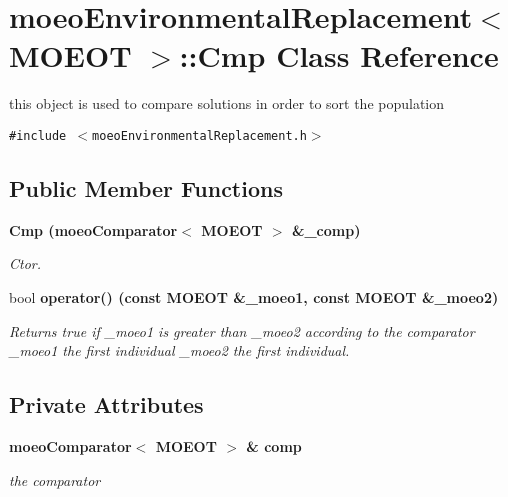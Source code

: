 \section{moeo\-Environmental\-Replacement$<$ MOEOT $>$::Cmp Class Reference}
\label{classmoeoEnvironmentalReplacement_1_1Cmp}
this object is used to compare solutions in order to sort the population  


{\tt \#include $<$moeo\-Environmental\-Replacement.h$>$}

\subsection*{Public Member Functions}
\begin{CompactItemize}
\item 
\bf{Cmp} (\bf{moeo\-Comparator}$<$ MOEOT $>$ \&\_\-comp)
\begin{CompactList}\small\item\em Ctor. \item\end{CompactList}\item 
bool \bf{operator()} (const MOEOT \&\_\-moeo1, const MOEOT \&\_\-moeo2)\label{classmoeoEnvironmentalReplacement_1_1Cmp_b006918d5d6fc1f87fb9ed585946595a}

\begin{CompactList}\small\item\em Returns true if \_\-moeo1 is greater than \_\-moeo2 according to the comparator \_\-moeo1 the first individual \_\-moeo2 the first individual. \item\end{CompactList}\end{CompactItemize}
\subsection*{Private Attributes}
\begin{CompactItemize}
\item 
\bf{moeo\-Comparator}$<$ MOEOT $>$ \& \bf{comp}\label{classmoeoEnvironmentalReplacement_1_1Cmp_5c345292ee3ec6b8f7b79dafe3ac2c81}

\begin{CompactList}\small\item\em the comparator \item\end{CompactList}\end{CompactItemize}


